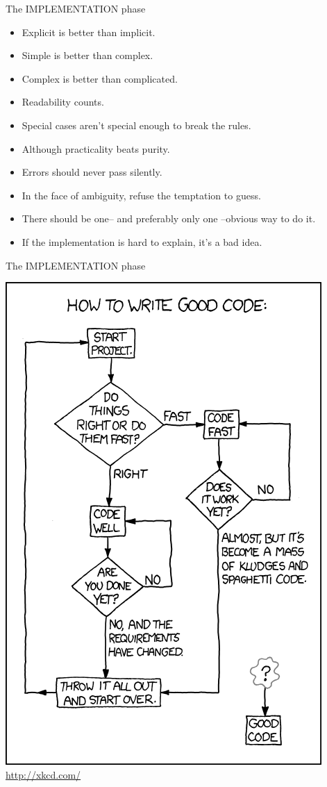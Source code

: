 \documentclass[xcolor=x11names,compress]{beamer}
\renewcommand{\(}{\begin{columns}}
\renewcommand{\)}{\end{columns}}
\newcommand{\<}[1]{\begin{column}{#1}}
\renewcommand{\>}{\end{column}}
\begin{document}
\begin{frame}{The IMPLEMENTATION phase}

  \begin{itemize}\itemsep6pt
    \item Explicit is better than implicit.
    \item Simple is better than complex.
    \item Complex is better than complicated.
    \item Readability counts.
    \item Special cases aren't special enough to break the rules.
    \item Although practicality beats purity.
    \item Errors should never pass silently.
    \item In the face of ambiguity, refuse the temptation to guess.
    \item There should be one-- and preferably only one --obvious way to do it.
    \item If the implementation is hard to explain, it's a bad idea.
 \end{itemize}

\end{frame}

\begin{frame}{The IMPLEMENTATION phase}

 \centering
 \includegraphics[width=.4\textwidth]{good_code.png}\\
    {\small \url{http://xkcd.com/}}

\end{frame}
\end{document}
